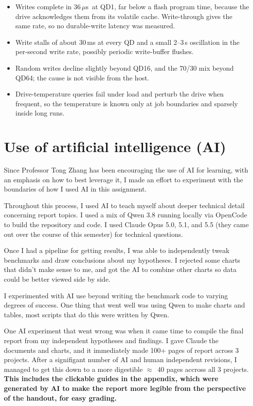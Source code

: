 \documentclass{article}
\newcommand{\us}{\,$\mu$s}
\begin{document}
\begin{itemize}
  \item Writes complete in 36\us\ at QD1, far below a flash program time, because the drive acknowledges them from its volatile cache. Write-through gives the same rate, so no durable-write latency was measured.
  \item Write stalls of about 30\,ms at every QD and a small 2--3\,s oscillation in the per-second write rate, possibly periodic write-buffer flushes.
  \item Random writes decline slightly beyond QD16, and the 70/30 mix beyond QD64; the cause is not visible from the host.
  \item Drive-temperature queries fail under load and perturb the drive when frequent, so the temperature is known only at job boundaries and sparsely inside long runs.
\end{itemize}

\section{Use of artificial intelligence (AI)}\label{sec:aiuse}
Since Professor Tong Zhang has been encouraging the use of AI for learning, with an emphasis on how to best leverage it, I made an effort to experiment with the boundaries of how I used AI in this assignment.

Throughout this process, I used AI to teach myself about deeper technical detail concerning report topics. I used a mix of Qwen 3.8 running locally via OpenCode to build the repository and code. I used Claude Opus 5.0, 5.1, and 5.5 (they came out over the course of this semester) for technical questions.

Once I had a pipeline for getting results, I was able to independently tweak benchmarks and draw conclusions about my hypotheses. I rejected some charts that didn't make sense to me, and got the AI to combine other charts so data could be better viewed side by side.

I experimented with AI use beyond writing the benchmark code to varying degrees of success. One thing that went well was using Qwen to make charts and tables, most scripts that do this were written by Qwen.

One AI experiment that went wrong was when it came time to compile the final report from my independent hypotheses and findings. I gave Claude the documents and charts, and it immediately made 100+ pages of report across 3 projects. After a signifigant number of AI and human independent revisions, I managed to get this down to a more digestible $\approx$~40 pages accross all 3 projects. \textbf{This includes the clickable guides in the appendix, which were generated by AI to make the report more legible from the perspective of the handout, for easy grading.}
\end{document}
